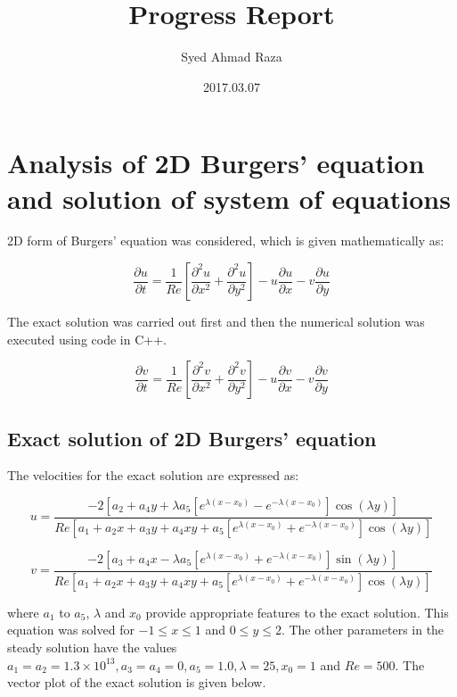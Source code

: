 \documentclass[12pt,a4paper,fleqn]{article}
\title{Progress Report}
\author{Syed Ahmad Raza}
\date{2017.03.07}
\begin{document}
\maketitle
\section*{Analysis of 2D Burgers' equation and solution of system of equations}

2D form of Burgers' equation was considered, which is given mathematically as:

\begin{equation}
\frac{\partial u}{\partial t} = \frac{1}{Re}\left[\frac{\partial^2u}{\partial
x^2} + \frac{\partial^2u}{\partial y^2}\right] - u
\frac{\partial u}{\partial x} - v \frac{\partial u}{\partial y}
\end{equation}

The exact solution was carried out first and then the numerical solution was
executed using code in C++.

\begin{equation}
\frac{\partial v}{\partial t} = \frac{1}{Re}\left[\frac{\partial^2v}{\partial
x^2} + \frac{\partial^2v}{\partial y^2}\right] - u
\frac{\partial v}{\partial x} - v \frac{\partial v}{\partial y}
\end{equation}

\subsection*{Exact solution of 2D Burgers' equation}
The velocities for the exact solution are expressed as:

\begin{equation}
u = \frac{-2[a_2 + a_4y + \lambda a_5[e^{\lambda (x - x_0)} - e^{-\lambda (x -
x_0)}]\cos(\lambda y)]}{Re[a_1 + a_2x + a_3y + a_4xy + a_5[e^{\lambda (x - x_0)} + e^{-\lambda (x -
x_0)}]\cos(\lambda y)]}
\end{equation}

\begin{equation}
v = \frac{-2[a_3 + a_4x - \lambda a_5[e^{\lambda (x - x_0)} + e^{-\lambda (x -
x_0)}]\sin(\lambda y)]}{Re[a_1 + a_2x + a_3y + a_4xy + a_5[e^{\lambda (x - x_0)}
+ e^{-\lambda (x - x_0)}]\cos(\lambda y)]}
\end{equation}

where $a_1$ to $a_5$, $\lambda$ and $x_0$ provide appropriate features
to the exact solution. This equation was solved for $-1\leq x \leq 1$ and
$0 \leq y \leq 2$. The other parameters in the steady solution have the values
$a_1 = a_2 = 1.3 \times 10^{13}, a_3 = a_4 = 0, a_5 = 1.0, \lambda = 25, x_0 =
1$ and $Re = 500$. The vector plot of the exact solution is given below.
\end{document}
